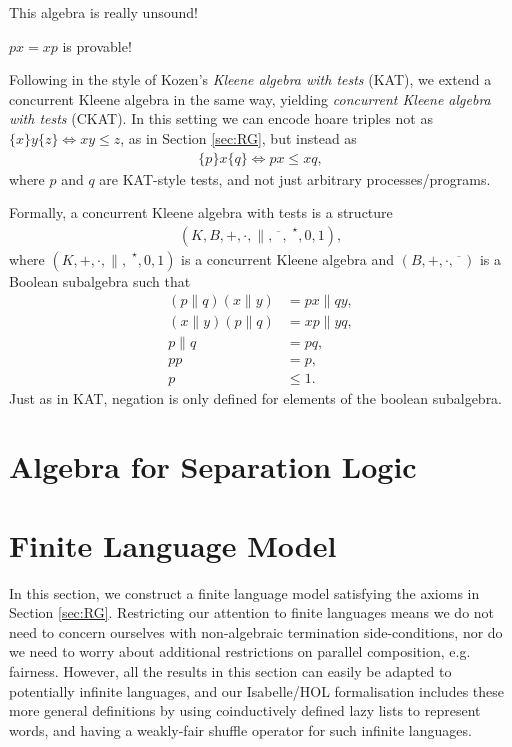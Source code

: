 \documentclass{llncs}
\begin{document}
This algebra is really unsound!

$px = xp$ is provable!

Following in the style of Kozen's \emph{Kleene algebra with tests}
(KAT), we extend a concurrent Kleene algebra in the same way, yielding
\emph{concurrent Kleene algebra with tests} (CKAT). In this setting we
can encode hoare triples not as $\{x\}y\{z\} \iff xy \le z$, as in
Section \ref{sec:RG}, but instead as
\begin{align*}
\{p\}x\{q\} \iff px \le xq,
\end{align*}
where $p$ and $q$ are KAT-style tests, and not just arbitrary
processes/programs.

Formally, a concurrent Kleene algebra with tests is a structure
\begin{align*}
(K,B,+,\cdot,\|,\overline{\phantom{x}},\phantom{|}^\star,0,1),
\end{align*}
where $(K,+,\cdot,\|,\phantom{|}^\star,0,1)$ is a concurrent Kleene
algebra and $(B,+,\cdot,\overline{\phantom{x}})$ is a Boolean subalgebra such that
\begin{align*}
(p\|q)(x\|y) &= px\|qy,\\ %
(x\|y)(p\|q) &= xp\|yq,\\
p\|q &= pq,\\
pp &= p,\\
p &\le 1.
\end{align*}
Just as in KAT, negation is only defined for elements of the boolean
subalgebra.

\newpage
\section{Algebra for Separation Logic}


\newpage
\section{Finite Language Model}
\label{sec:Model}

In this section, we construct a finite language model satisfying the
axioms in Section \ref{sec:RG}. Restricting our attention to finite
languages means we do not need to concern ourselves with non-algebraic
termination side-conditions, nor do we need to worry about additional
restrictions on parallel composition, e.g. fairness. However, all the
results in this section can easily be adapted to potentially
infinite languages, and our Isabelle/HOL formalisation includes these more
general definitions by using coinductively defined lazy lists to
represent words, and having a weakly-fair shuffle operator for such
infinite languages.
\end{document}
